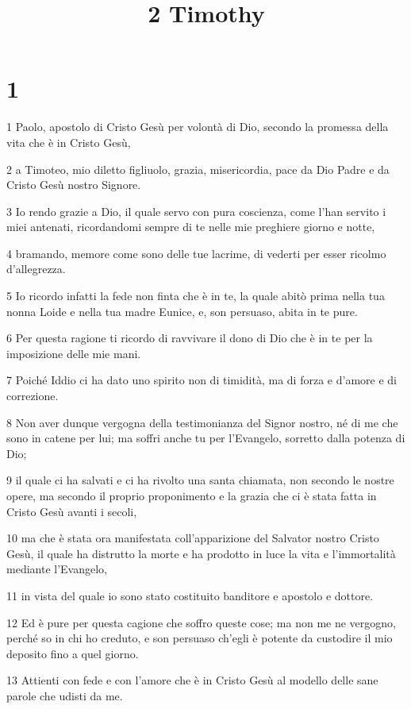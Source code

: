 

\title{2 Timothy}


\chapter{1}

\par 1 Paolo, apostolo di Cristo Gesù per volontà di Dio, secondo la promessa della vita che è in Cristo Gesù,
\par 2 a Timoteo, mio diletto figliuolo, grazia, misericordia, pace da Dio Padre e da Cristo Gesù nostro Signore.
\par 3 Io rendo grazie a Dio, il quale servo con pura coscienza, come l'han servito i miei antenati, ricordandomi sempre di te nelle mie preghiere giorno e notte,
\par 4 bramando, memore come sono delle tue lacrime, di vederti per esser ricolmo d'allegrezza.
\par 5 Io ricordo infatti la fede non finta che è in te, la quale abitò prima nella tua nonna Loide e nella tua madre Eunice, e, son persuaso, abita in te pure.
\par 6 Per questa ragione ti ricordo di ravvivare il dono di Dio che è in te per la imposizione delle mie mani.
\par 7 Poiché Iddio ci ha dato uno spirito non di timidità, ma di forza e d'amore e di correzione.
\par 8 Non aver dunque vergogna della testimonianza del Signor nostro, né di me che sono in catene per lui; ma soffri anche tu per l'Evangelo, sorretto dalla potenza di Dio;
\par 9 il quale ci ha salvati e ci ha rivolto una santa chiamata, non secondo le nostre opere, ma secondo il proprio proponimento e la grazia che ci è stata fatta in Cristo Gesù avanti i secoli,
\par 10 ma che è stata ora manifestata coll'apparizione del Salvator nostro Cristo Gesù, il quale ha distrutto la morte e ha prodotto in luce la vita e l'immortalità mediante l'Evangelo,
\par 11 in vista del quale io sono stato costituito banditore e apostolo e dottore.
\par 12 Ed è pure per questa cagione che soffro queste cose; ma non me ne vergogno, perché so in chi ho creduto, e son persuaso ch'egli è potente da custodire il mio deposito fino a quel giorno.
\par 13 Attienti con fede e con l'amore che è in Cristo Gesù al modello delle sane parole che udisti da me.
